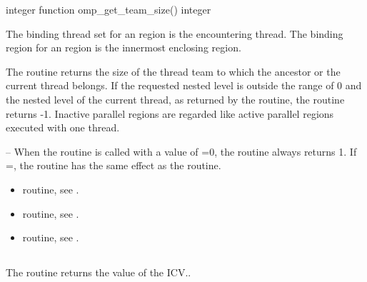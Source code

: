 \fortranspecificstart
\begin{boxedcode}
integer function omp\_get\_team\_size()
integer 
\end{boxedcode}
\fortranspecificend

\binding
The binding thread set for an  region is the encountering 
thread. The binding region for an  region is the innermost 
enclosing  region.

\effect
The  routine returns the size of the thread team to which the 
ancestor or the current thread belongs. If the requested nested level is outside the range 
of 0 and the nested level of the current thread, as returned by the  
routine, the routine returns -1. Inactive parallel regions are regarded like active parallel 
regions executed with one thread. 

\notestart
\noteheader – When the  routine is called with a value of =0, 
the routine always returns 1. If =, the routine has the same 
effect as the\linebreak {} routine. 
\noteend

\crossreferences
\begin{itemize}
\item {} routine, see 
.

\item {} routine, see 
.

\item {} routine, see 
.
\end{itemize}









\subsection{}
\label{subsec:omp_get_active_level}
\summary
The  routine returns the value of the  ICV..

